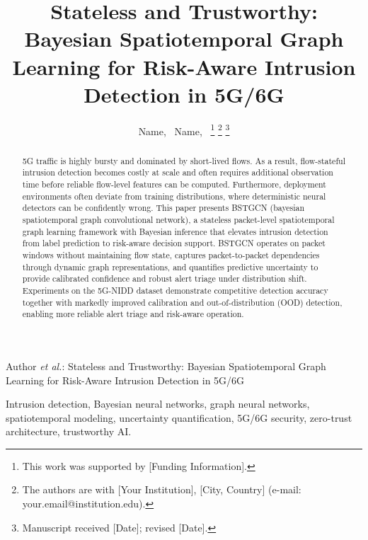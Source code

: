 \documentclass[lettersize,journal]{IEEEtran}
\begin{document}
\title{Stateless and Trustworthy: Bayesian Spatiotemporal Graph Learning for Risk-Aware Intrusion Detection in 5G/6G}

\author{ Name,~
         Name,~
\thanks{This work was supported by [Funding Information].}%
\thanks{The authors are with [Your Institution], [City, Country] (e-mail: your.email@institution.edu).}
\thanks{Manuscript received [Date]; revised [Date].}}

%
{Author \MakeLowercase{\textit{et al.}}: Stateless and Trustworthy: Bayesian Spatiotemporal Graph Learning for Risk-Aware Intrusion Detection in 5G/6G}


\maketitle

\begin{abstract}
5G traffic is highly bursty and dominated by short-lived flows. As a result, flow-stateful intrusion detection becomes costly at scale and often requires additional observation time before reliable flow-level features can be computed. Furthermore, deployment environments often deviate from training distributions, where deterministic neural detectors can be confidently wrong. This paper presents BSTGCN (bayesian spatiotemporal graph convolutional network), a stateless packet-level spatiotemporal graph learning framework with Bayesian inference that elevates intrusion detection from label prediction to risk-aware decision support. BSTGCN operates on packet windows without maintaining flow state, captures packet-to-packet dependencies through dynamic graph representations, and quantifies predictive uncertainty to provide calibrated confidence and robust alert triage under distribution shift. Experiments on the 5G-NIDD dataset demonstrate competitive detection accuracy together with markedly improved calibration and out-of-distribution (OOD) detection, enabling more reliable alert triage and risk-aware operation.
\end{abstract}

\begin{IEEEkeywords}
Intrusion detection, Bayesian neural networks, graph neural networks, spatiotemporal modeling, uncertainty quantification, 5G/6G security, zero-trust architecture, trustworthy AI.
\end{IEEEkeywords}
\end{document}
